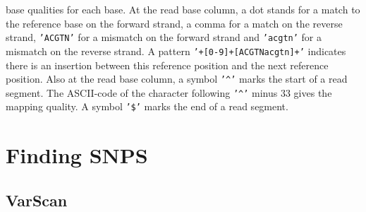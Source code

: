 \documentclass[12pt,a4paper]{article}
\begin{document}
\begin{enumerate}
          base qualities for each base. At the read base column, a dot
          stands for a match to the reference base on the forward
          strand, a comma for a match on the reverse strand,
          \texttt{'ACGTN'} for a mismatch on the forward strand and
          \texttt{'acgtn'} for a mismatch on the reverse strand. A
          pattern \texttt{'+[0-9]+[ACGTNacgtn]+'} indicates there is
          an insertion between this reference position and the next
          reference position. Also at the read base column, a symbol
          \texttt{'\textasciicircum'} marks the start of a read
          segment. The ASCII-code of the character following
          \texttt{'\textasciicircum'} minus 33 gives the mapping
          quality. A symbol \texttt{'\$'} marks the end of a read
          segment.
\end{enumerate}

\section{Finding SNPS}

\subsection{VarScan}
\end{document}
